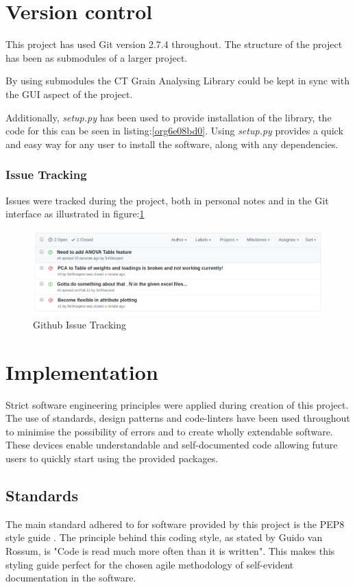 \documentclass[11pt]{report}
\begin{document}
\section{Version control}
\label{sec:org5ab200e}
This project has used Git version 2.7.4 throughout. The structure of the project has been as submodules of a larger project.

By using submodules the CT Grain Analysing Library could be kept in sync with the GUI aspect of the project.

Additionally, \emph{setup.py} has been used to provide installation of the library, the code for this can be seen in listing:\ref{org6e08bd0}. Using \emph{setup.py} provides a quick and easy way for any user to install the software, along with any dependencies.

\subsubsection{Issue Tracking}
\label{sec:org5d0281d}
Issues were tracked during the project, both in personal notes and in the Git interface as illustrated in figure:\ref{fig:org3cfeeb2}
\begin{figure}[htbp]
\centering
\includegraphics[width=12cm]{./images/github.png}
\caption{\label{fig:org3cfeeb2}
Github Issue Tracking}
\end{figure}

\section{Implementation}
\label{sec:org8d7b9d5}
Strict software engineering principles were applied during creation of this project. The use of standards, design patterns and code-linters have been used throughout to minimise the possibility of errors and to create wholly extendable software. These devices enable understandable and self-documented code allowing future users to quickly start using the provided packages.
\subsection{Standards}
\label{sec:orgbdf080b}
The main standard adhered to for software provided by this project is the PEP8 style guide \cite{VanRossum}. The principle behind this coding style, as stated by Guido van Rossum, is "Code is read much more often than it is written". This makes this styling guide perfect for the chosen agile methodology of self-evident documentation in the software.
\end{document}
